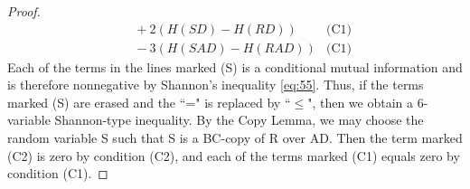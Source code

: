 \documentclass[10pt,journal]{IEEEtran}
\begin{document}
\begin{proof}
\begin{align*}
       &\ \ + 2(H(SD)-H(RD))      &                                                    \text{(C1)}  \\
       &\ \ - 3(H(SAD)-H(RAD))     &                                                   \text{(C1)}
\end{align*}
Each of the terms in the lines marked (S) is a conditional mutual
information and is therefore nonnegative by Shannon's inequality \eqref{eq:55}.  Thus, if the terms marked (S)
are erased and the ``=" is replaced by ``$\leq$", then we obtain a 6-variable
Shannon-type inequality.  By the Copy Lemma, we may choose the random variable S such
that S is a BC-copy of R over AD.  Then the term marked (C2) is zero
by condition (C2), and each of the terms marked (C1) equals zero
by condition (C1).
\end{proof}
\end{document}
